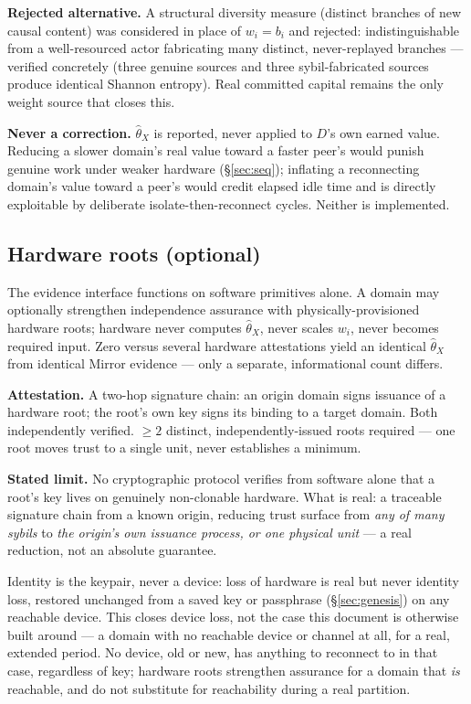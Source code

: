 \documentclass[10pt]{article}
\begin{document}
\textbf{Rejected alternative.} A structural diversity measure (distinct branches of new causal content) was considered in place of $w_i = b_i$ and rejected: indistinguishable from a well-resourced actor fabricating many distinct, never-replayed branches --- verified concretely (three genuine sources and three sybil-fabricated sources produce identical Shannon entropy). Real committed capital remains the only weight source that closes this.

\textbf{Never a correction.} $\hat\theta_X$ is reported, never applied to $D$'s own earned value. Reducing a slower domain's real value toward a faster peer's would punish genuine work under weaker hardware (\S\ref{sec:seq}); inflating a reconnecting domain's value toward a peer's would credit elapsed idle time and is directly exploitable by deliberate isolate-then-reconnect cycles. Neither is implemented.

\subsection{Hardware roots (optional)}
\label{sec:hw}

The evidence interface functions on software primitives alone. A domain may optionally strengthen independence assurance with physically-provisioned hardware roots; hardware never computes $\hat\theta_X$, never scales $w_i$, never becomes required input. Zero versus several hardware attestations yield an identical $\hat\theta_X$ from identical Mirror evidence --- only a separate, informational count differs.

\textbf{Attestation.} A two-hop signature chain: an origin domain signs issuance of a hardware root; the root's own key signs its binding to a target domain. Both independently verified. $\geq 2$ distinct, independently-issued roots required --- one root moves trust to a single unit, never establishes a minimum.

\textbf{Stated limit.} No cryptographic protocol verifies from software alone that a root's key lives on genuinely non-clonable hardware. What is real: a traceable signature chain from a known origin, reducing trust surface from \emph{any of many sybils} to \emph{the origin's own issuance process, or one physical unit} --- a real reduction, not an absolute guarantee.

Identity is the keypair, never a device: loss of hardware is real but never identity loss, restored unchanged from a saved key or passphrase (\S\ref{sec:genesis}) on any reachable device. This closes device loss, not the case this document is otherwise built around --- a domain with no reachable device or channel at all, for a real, extended period. No device, old or new, has anything to reconnect to in that case, regardless of key; hardware roots strengthen assurance for a domain that \emph{is} reachable, and do not substitute for reachability during a real partition.
\end{document}
